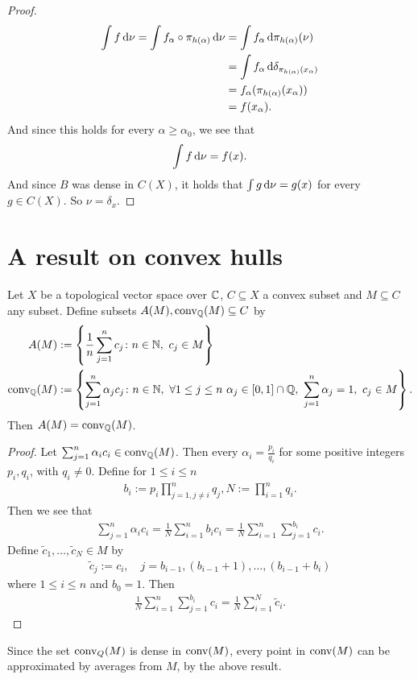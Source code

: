 \begin{lemma}
\begin{proof}
\begin{align*}
\int f \mathop{}\!\mathrm{d} \nu = \int f_{\alpha} \circ \pi_{h(\alpha)} \mathop{}\!\mathrm{d} \nu &= \int f_{\alpha} \mathop{}\!\mathrm{d} \pi_{h(\alpha)}(\nu)\\
&=\int f_{\alpha} \mathop{}\!\mathrm{d} \delta_{\pi_{h(\alpha)}(x_{\alpha})}\\
&=f_{\alpha}( \pi_{h(\alpha)}(x_{\alpha}))\\
&=f(x_{\alpha}).
\end{align*}
And since this holds for every $\alpha \geq \alpha_0$, we see that
\begin{align*}
\int f \mathop{}\!\mathrm{d} \nu = f(x).
\end{align*}
And since $B$ was dense in $C(X)$, it holds that $\int g \mathop{}\!\mathrm{d} \nu=g(x)$ for every $g \in C(X)$. So $\nu = \delta_{x}$. 
\end{proof}
\end{lemma}

\chapter{A result on convex hulls}
\begin{lemma}\label{ez rat co}
Let $X$ be a topological vector space over $\mathbb{C}$, $C \subseteq X$ a convex subset and $M \subseteq C$ any subset. Define subsets $A(M), \operatorname{conv}_{\mathbb{Q}}(M) \subseteq C$ by
\begin{align*}
A(M)&:=\left\{ \frac{1}{n} \sum_{j=1}^n c_j \colon n \in \mathbb{N}, \ c_j \in M\right\}\\
\operatorname{conv}_{\mathbb{Q}}(M) &:=\left\{ \sum_{j=1}^n \alpha_j c_j \colon n \in \mathbb{N}, \ \forall 1 \leq j \leq n \ \alpha_j \in [0,1] \cap \mathbb{Q}, \ \sum_{j=1}^n \alpha_j = 1, \ c_j \in M\right\}.
\end{align*}
Then $A(M)=\operatorname{conv}_{\mathbb{Q}}(M)$.
\begin{proof}
Let $\sum_{j=1}^n \alpha_i c_i \in \operatorname{conv}_{\mathbb{Q}}(M)$. Then every $\alpha_i= \frac{p_i}{q_i}$ for some positive integers $p_i,q_i $, with $q_i \neq 0$. Define for $1 \leq i \leq n$
\begin{align*}
b_i := p_i \prod_{j=1, j \neq i}^n q_j,
N:= \prod_{i=1}^n q_i.
\end{align*}
Then we see that
\begin{align*}
\sum_{j=1}^n \alpha_i c_i = \frac{1}{N} \sum_{i=1}^n b_i c_i = \frac{1}{N} \sum_{i=1}^n \sum_{j=1}^{b_i} c_i.
\end{align*}
Define $\tilde{c}_1,\dots, \tilde{c}_N \in M$ by 
\begin{align*}
\tilde{c}_j := c_i, \quad j=b_{i-1}, (b_{i-1}+1),\dots,(b_{i-1}+b_i)
\end{align*}
where $1 \leq i \leq n$ and $b_0=1$. Then
\begin{align*}
\frac{1}{N} \sum_{i=1}^n \sum_{j=1}^{b_i} c_i= \frac{1}{N} \sum_{i=1}^N \tilde{c}_i.
\end{align*}
\end{proof}
\end{lemma}
Since the set $\operatorname{conv}_Q(M)$ is dense in $\operatorname{conv}(M)$, every point in $\operatorname{conv}(M)$ can be approximated by averages from $M$, by the above result.